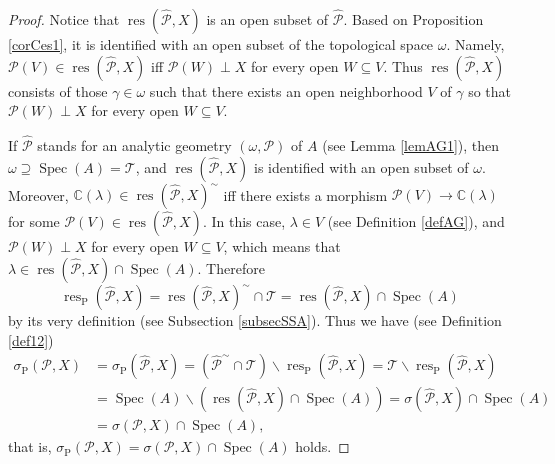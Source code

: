 \documentclass[12pt]{amsart}%
\theoremstyle{plain}
\numberwithin{equation}{section}
\numberwithin{equation}{section}
\numberwithin{theorem}{section}
\numberwithin{lemma}{section}
\numberwithin{remark}{section}
\numberwithin{example}{section}
\numberwithin{proposition}{section}
\numberwithin{definition}{section}
\numberwithin{corollary}{section}
\begin{document}
\begin{proof}
Notice that $\operatorname{res}\left(  \widehat{\mathcal{P}},X\right)  $ is an
open subset of $\widehat{\mathcal{P}}$. Based on Proposition \ref{corCes1}, it
is identified with an open subset of the topological space $\omega$. Namely,
$\mathcal{P}\left(  V\right)  \in\operatorname{res}\left(
\widehat{\mathcal{P}},X\right)  $ iff $\mathcal{P}\left(  W\right)  \perp X$
for every open $W\subseteq V$. Thus $\operatorname{res}\left(
\widehat{\mathcal{P}},X\right)  $ consists of those $\gamma\in\omega$ such
that there exists an open neighborhood $V$ of $\gamma$ so that $\mathcal{P}%
\left(  W\right)  \perp X$ for every open $W\subseteq V$.

If $\widehat{\mathcal{P}}$ stands for an analytic geometry $\left(
\omega,\mathcal{P}\right)  $ of $A$ (see Lemma \ref{lemAG1}), then
$\omega\supseteq\operatorname{Spec}\left(  A\right)  =\mathcal{T}$, and
$\operatorname{res}\left(  \widehat{\mathcal{P}},X\right)  $ is identified
with an open subset of $\omega$. Moreover, $\mathbb{C}\left(  \lambda\right)
\in\operatorname{res}\left(  \widehat{\mathcal{P}},X\right)  ^{\sim}$ iff
there exists a morphism $\mathcal{P}\left(  V\right)  \rightarrow
\mathbb{C}\left(  \lambda\right)  $ for some $\mathcal{P}\left(  V\right)
\in\operatorname{res}\left(  \widehat{\mathcal{P}},X\right)  $. In this case,
$\lambda\in V$ (see Definition \ref{defAG}), and $\mathcal{P}\left(  W\right)
\perp X$ for every open $W\subseteq V$, which means that $\lambda
\in\operatorname{res}\left(  \widehat{\mathcal{P}},X\right)  \cap
\operatorname{Spec}\left(  A\right)  $. Therefore
\[
\operatorname{res}_{\operatorname{P}}\left(  \widehat{\mathcal{P}},X\right)
=\operatorname{res}\left(  \widehat{\mathcal{P}},X\right)  ^{\sim}%
\cap\mathcal{T=}\operatorname{res}\left(  \widehat{\mathcal{P}},X\right)
\cap\operatorname{Spec}\left(  A\right)
\]
by its very definition (see Subsection \ref{subsecSSA}). Thus we have (see
Definition \ref{def12})
\begin{align*}
\sigma_{\operatorname{P}}\left(  \mathcal{P},X\right)   &  =\sigma
_{\operatorname{P}}\left(  \widehat{\mathcal{P}},X\right)  =\left(
\widehat{\mathcal{P}}^{\sim}\cap\mathcal{T}\right)  \backslash
\operatorname{res}_{\operatorname{P}}\left(  \widehat{\mathcal{P}},X\right)
=\mathcal{T}\backslash\operatorname{res}_{\operatorname{P}}\left(
\widehat{\mathcal{P}},X\right) \\
&  =\operatorname{Spec}\left(  A\right)  \backslash\left(  \operatorname{res}%
\left(  \widehat{\mathcal{P}},X\right)  \cap\operatorname{Spec}\left(
A\right)  \right)  =\sigma\left(  \widehat{\mathcal{P}},X\right)
\cap\operatorname{Spec}\left(  A\right) \\
&  =\sigma\left(  \mathcal{P},X\right)  \cap\operatorname{Spec}\left(
A\right)  ,
\end{align*}
that is, $\sigma_{\operatorname{P}}\left(  \mathcal{P},X\right)
=\sigma\left(  \mathcal{P},X\right)  \cap\operatorname{Spec}\left(  A\right)
$ holds.
\end{proof}
\end{document}
